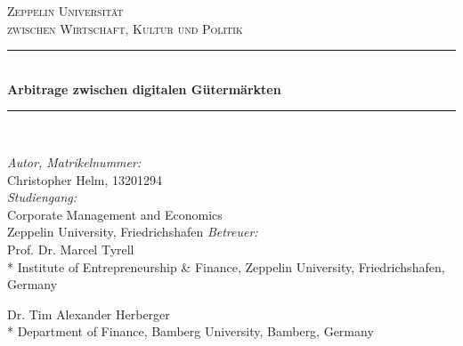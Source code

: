 \documentclass[12pt,a4paper,oneside]{article}
\newcommand{\HRule}{\rule{\linewidth}{0.5mm}}
\begin{document}
\fancyfoot{}
\pagestyle{fancy}
\fancyhead[R]{\thepage}

 
 
 
\setlength{\textheight}{240mm}
\setlength{\textwidth}{150mm}
\setlength{\hoffset}{2cm}
\setlength{\headsep}{1cm}
\setlength{\oddsidemargin}{0cm}
\setlength{\headheight}{0cm}
\setlength{\topmargin}{0cm}
\setlength{\footskip}{8pt}
\begin{titlepage}
	\begin{center}
	\textsc{\LARGE Zeppelin Universität}\\[1.5cm]
	\textsc{\Large zwischen Wirtschaft, Kultur und Politik}\\[0.5cm]

	\singlespacing
	\HRule \\[0.4cm]
	{ \huge \bfseries Arbitrage zwischen digitalen Gütermärkten %
	\\[0.4cm] }

	\HRule \\[1.5cm]
	\end{center}
	
\begin{flushleft} \large

\emph{Autor, Matrikelnummer:}\\

%
%
Christopher Helm, 13201294\\
\singlespacing
\emph{Studiengang:}\\
Corporate Management and Economics\\
Zeppelin University, Friedrichshafen
\singlespacing
\emph{Betreuer:}\\
Prof. Dr. Marcel Tyrell\\*
Institute of Entrepreneurship \& Finance, Zeppelin University, Friedrichshafen, Germany

\newline

Dr. Tim Alexander Herberger\\*
Department of Finance, Bamberg University, Bamberg, Germany\\
\singlespacing


\end{flushleft}
\end{titlepage}
\end{document}
